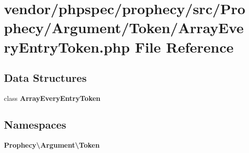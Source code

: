 \section{vendor/phpspec/prophecy/src/\+Prophecy/\+Argument/\+Token/\+Array\+Every\+Entry\+Token.php File Reference}
\label{_array_every_entry_token_8php}
\subsection*{Data Structures}
\begin{DoxyCompactItemize}
\item 
class {\bf Array\+Every\+Entry\+Token}
\end{DoxyCompactItemize}
\subsection*{Namespaces}
\begin{DoxyCompactItemize}
\item 
 {\bf Prophecy\textbackslash{}\+Argument\textbackslash{}\+Token}
\end{DoxyCompactItemize}

